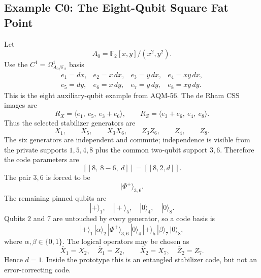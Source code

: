\subsection{Example C0: The Eight-Qubit Square Fat Point}
Let
\[
  A_0=\mathbb F_2[x,y]/(x^2,y^2).
\]
Use the \(C^1=\Omega^1_{A_0/\mathbb F_2}\) basis
\[
\begin{array}{llll}
e_1=dx,&e_2=x\,dx,&e_3=y\,dx,&e_4=xy\,dx,\\
e_5=dy,&e_6=x\,dy,&e_7=y\,dy,&e_8=xy\,dy.
\end{array}
\]
This is the eight auxiliary-qubit example from AQM-56.  The de Rham CSS images
are
\[
  R_X=\langle e_1,\ e_5,\ e_3+e_6\rangle,\qquad
  R_Z=\langle e_3+e_6,\ e_4,\ e_8\rangle.
\]
Thus the selected stabilizer generators are
\[
  X_1,\qquad X_5,\qquad X_3X_6,\qquad
  Z_3Z_6,\qquad Z_4,\qquad Z_8.
\]
The six generators are independent and commute; independence is visible from
the private supports \(1,5,4,8\) plus the common two-qubit support \(3,6\).
Therefore the code parameters are
\[
  [[8,\ 8-6,\ d]]=[[8,2,d]].
\]
The pair \(3,6\) is forced to be
\[
  |\Phi^+\rangle_{3,6}.
\]
The remaining pinned qubits are
\[
  |+\rangle_1,\quad |+\rangle_5,\quad |0\rangle_4,\quad |0\rangle_8.
\]
Qubits \(2\) and \(7\) are untouched by every generator, so a code basis is
\[
  |+\rangle_1\,|\alpha\rangle_2\,|\Phi^+\rangle_{3,6}\,
  |0\rangle_4\,|+\rangle_5\,|\beta\rangle_7\,|0\rangle_8,
\]
where \(\alpha,\beta\in\{0,1\}\).  The logical operators may be chosen as
\[
  \bar X_1=X_2,\quad \bar Z_1=Z_2,\qquad
  \bar X_2=X_7,\quad \bar Z_2=Z_7.
\]
Hence \(d=1\).  Inside the prototype this is an entangled stabilizer code, but
not an error-correcting code.
